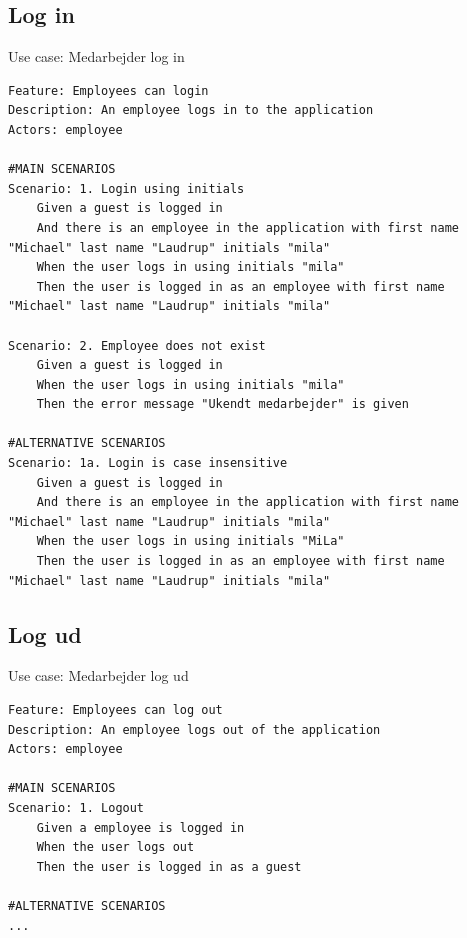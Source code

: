 \subsection{Log in} 
\begin{listing}[H]
    \centering
    \caption{Use case: Medarbejder log in}\label{lst:usecase_login}
    \begin{verbatim}  
Feature: Employees can login
Description: An employee logs in to the application
Actors: employee

#MAIN SCENARIOS
Scenario: 1. Login using initials
    Given a guest is logged in
    And there is an employee in the application with first name "Michael" last name "Laudrup" initials "mila" 
    When the user logs in using initials "mila" 
    Then the user is logged in as an employee with first name "Michael" last name "Laudrup" initials "mila" 

Scenario: 2. Employee does not exist
    Given a guest is logged in
    When the user logs in using initials "mila" 
    Then the error message "Ukendt medarbejder" is given 

#ALTERNATIVE SCENARIOS
Scenario: 1a. Login is case insensitive
    Given a guest is logged in
    And there is an employee in the application with first name "Michael" last name "Laudrup" initials "mila" 
    When the user logs in using initials "MiLa" 
    Then the user is logged in as an employee with first name "Michael" last name "Laudrup" initials "mila" 
    \end{verbatim}
\end{listing}

\subsection{Log ud} 
\begin{listing}[H]
    \centering
    \caption{Use case: Medarbejder log ud}\label{lst:usecase_logout}
    \begin{verbatim}  
Feature: Employees can log out
Description: An employee logs out of the application
Actors: employee

#MAIN SCENARIOS
Scenario: 1. Logout
    Given a employee is logged in
    When the user logs out
    Then the user is logged in as a guest

#ALTERNATIVE SCENARIOS
...
    \end{verbatim}
\end{listing}

